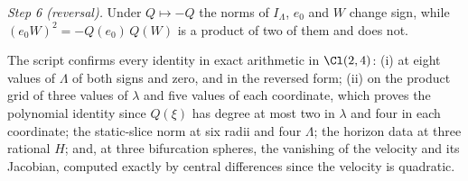 \emph{Step 6 (reversal).} Under $Q \mapsto -Q$ the norms of $I_{\Lambda}$, $e_{0}$ and $W$ change sign, while $(e_{0}W)^{2} = -Q(e_{0})\,Q(W)$ is a product of two of them and does not.

The script  confirms every identity in exact arithmetic in $\Cl(2,4)$: (i) at eight values of $\Lambda$ of both signs and zero, and in the reversed form; (ii) on the product grid of three values of $\lambda$ and five values of each coordinate, which proves the polynomial identity since $Q(\xi)$ has degree at most two in $\lambda$ and four in each coordinate; the static-slice norm at six radii and four $\Lambda$; the horizon data at three rational $H$; and, at three bifurcation spheres, the vanishing of the velocity and its Jacobian, computed exactly by central differences since the velocity is quadratic.
